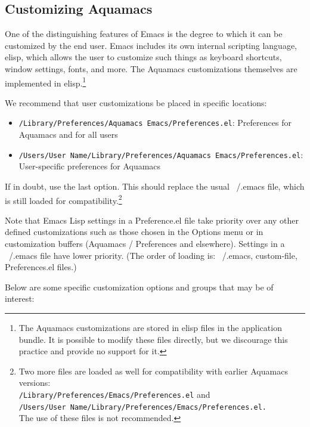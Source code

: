 \documentclass[11pt,letterpaper]{article}
\newcommand{\ttfile}{\tt}
\begin{document}
\subsection{Customizing Aquamacs}
One of the distinguishing features of Emacs is the degree to which it can be customized by the end user. Emacs includes its own internal scripting language, elisp, which allows the user to customize such things as keyboard shortcuts, window settings, fonts, and more. The Aquamacs customizations themselves are implemented in elisp.\footnote{The Aquamacs customizations are stored in elisp files in the application bundle. It is possible to modify these files directly, but we discourage this practice and provide no support for it.}


We recommend that user customizations be placed in specific locations:

\begin{itemize}
\item {\ttfile /Library/Preferences/Aquamacs~Emacs/Preferences.el}: Preferences for  Aquamacs and for all users
\item {\ttfile /Users/User Name/Library/Preferences/Aquamacs~Emacs/Preferences.el}: \\ User-specific  preferences for Aquamacs
\end{itemize}

If in doubt, use the last option. This should replace the usual ~/.emacs file, which is still loaded for
compatibility.\footnote{Two more files are loaded as well for
  compatibility with earlier Aquamacs versions: \\
  {\ttfile /Library/Preferences/Emacs/Preferences.el} and \\
  {\ttfile /Users/User Name/Library/Preferences/Emacs/Preferences.el.}
  \\ The use of
  these files is not recommended.}

Note that Emacs Lisp settings in a Preference.el file take priority over any other defined customizations such as those chosen in the Options menu or in customization buffers (Aquamacs / Preferences and elsewhere).  Settings in a ~/.emacs file have lower priority.  (The order of loading is: ~/.emacs, custom-file, Preferences.el files.)

Below are some specific customization options and groups that may be of interest:
\end{document}

